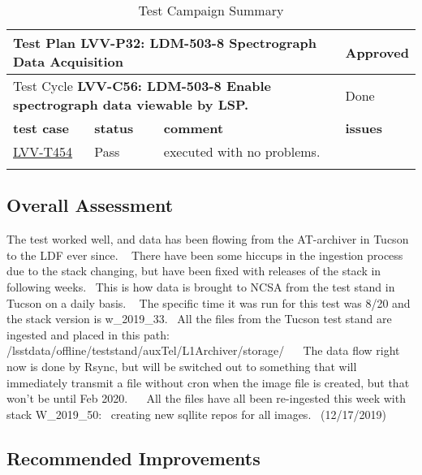\documentclass[DM,lsstdraft,STR,toc]{lsstdoc}
\begin{document}
\begin{longtable}{p{2cm}p{2.5cm}p{9cm}p{2.5cm}}
\toprule
\multicolumn{3}{l}{ Test Plan {\bf LVV-P32: LDM-503-8 Spectrograph Data Acquisition
 }} & Approved \\\hline

  \multicolumn{3}{l}{ Test Cycle {\bf LVV-C56: LDM-503-8 Enable spectrograph data viewable by LSP.
 }} & Done \\\hline

  {\bf \footnotesize test case} & {\bf \footnotesize status} & {\bf \footnotesize comment} & {\bf \footnotesize issues} \\\toprule

\href{https://jira.lsstcorp.org/secure/Tests.jspa#/testCase/LVV-T454}{LVV-T454}
    & Pass &
    \begin{minipage}[]{9cm}
    \smallskip
    executed with no problems.~

    \medskip
    \end{minipage}
    &
    \\\hline
\caption{Test Campaign Summary}
\label{table:summary}
\end{longtable}

\subsection{Overall Assessment}
\label{sect:overallassessment}

The test worked well, and data has been flowing from the AT-archiver in
Tucson to the LDF ever since. ~ There have been some hiccups in the
ingestion process due to the stack changing, but have been fixed with
releases of the stack in following weeks. ~This is how data is brought
to NCSA from the test stand in Tucson on a daily basis. ~ The specific
time it was run for this test was 8/20 and the stack version is
w\_2019\_33. ~All the files from the Tucson test stand are ingested and
placed in this path:
/lsstdata/offline/teststand/auxTel/L1Archiver/storage/ ~ ~The data flow
right now is done by Rsync, but will be switched out to something that
will immediately transmit a file without cron when the image file is
created, but that won't be until Feb 2020. ~ ~All the files have all
been re-ingested this week with stack W\_2019\_50: ~creating new sqllite
repos for all images. ~(12/17/2019)~


\subsection{Recommended Improvements}
\label{sect:recommendations}
\end{document}
